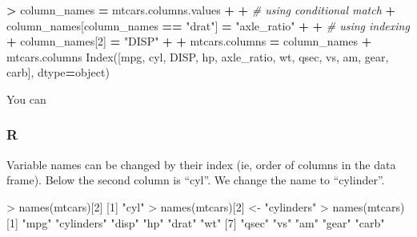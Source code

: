 \documentclass[
]{book}
\newenvironment{Shaded}{\begin{snugshade}}{\end{snugshade}}
\newcommand{\CommentTok}[1]{\textcolor[rgb]{0.56,0.35,0.01}{\textit{#1}}}
\newcommand{\DecValTok}[1]{\textcolor[rgb]{0.00,0.00,0.81}{#1}}
\newcommand{\FunctionTok}[1]{\textcolor[rgb]{0.00,0.00,0.00}{#1}}
\newcommand{\NormalTok}[1]{#1}
\newcommand{\OperatorTok}[1]{\textcolor[rgb]{0.81,0.36,0.00}{\textbf{#1}}}
\newcommand{\OtherTok}[1]{\textcolor[rgb]{0.56,0.35,0.01}{#1}}
\newcommand{\SpecialCharTok}[1]{\textcolor[rgb]{0.00,0.00,0.00}{#1}}
\newcommand{\StringTok}[1]{\textcolor[rgb]{0.31,0.60,0.02}{#1}}
\begin{document}
\begin{Shaded}
\begin{Highlighting}[]
\OperatorTok{\textgreater{}}\NormalTok{ column\_names }\OperatorTok{=}\NormalTok{ mtcars.columns.values}
\OperatorTok{+} 
\OperatorTok{+} \CommentTok{\# using conditional match}
\OperatorTok{+}\NormalTok{ column\_names[column\_names }\OperatorTok{==} \StringTok{"drat"}\NormalTok{] }\OperatorTok{=} \StringTok{"axle\_ratio"}
\OperatorTok{+} 
\OperatorTok{+} \CommentTok{\# using indexing}
\OperatorTok{+}\NormalTok{ column\_names[}\DecValTok{2}\NormalTok{] }\OperatorTok{=} \StringTok{"DISP"}
\OperatorTok{+} 
\OperatorTok{+}\NormalTok{ mtcars.columns }\OperatorTok{=}\NormalTok{ column\_names}
\OperatorTok{+}\NormalTok{ mtcars.columns}
\NormalTok{Index([}\StringTok{\textquotesingle{}mpg\textquotesingle{}}\NormalTok{, }\StringTok{\textquotesingle{}cyl\textquotesingle{}}\NormalTok{, }\StringTok{\textquotesingle{}DISP\textquotesingle{}}\NormalTok{, }\StringTok{\textquotesingle{}hp\textquotesingle{}}\NormalTok{, }\StringTok{\textquotesingle{}axle\_ratio\textquotesingle{}}\NormalTok{, }\StringTok{\textquotesingle{}wt\textquotesingle{}}\NormalTok{, }\StringTok{\textquotesingle{}qsec\textquotesingle{}}\NormalTok{, }\StringTok{\textquotesingle{}vs\textquotesingle{}}\NormalTok{, }\StringTok{\textquotesingle{}am\textquotesingle{}}\NormalTok{,}
       \StringTok{\textquotesingle{}gear\textquotesingle{}}\NormalTok{, }\StringTok{\textquotesingle{}carb\textquotesingle{}}\NormalTok{],}
\NormalTok{      dtype}\OperatorTok{=}\StringTok{\textquotesingle{}object\textquotesingle{}}\NormalTok{)}
\end{Highlighting}
\end{Shaded}

You can

\hypertarget{r-16}{%
\subsubsection*{R}\label{r-16}}

Variable names can be changed by their index (ie, order of columns in the data frame). Below the second column is ``cyl''. We change the name to ``cylinder''.

\begin{Shaded}
\begin{Highlighting}[]
\SpecialCharTok{\textgreater{}} \FunctionTok{names}\NormalTok{(mtcars)[}\DecValTok{2}\NormalTok{]}
\NormalTok{[}\DecValTok{1}\NormalTok{] }\StringTok{"cyl"}
\SpecialCharTok{\textgreater{}} \FunctionTok{names}\NormalTok{(mtcars)[}\DecValTok{2}\NormalTok{] }\OtherTok{\textless{}{-}} \StringTok{"cylinders"}
\SpecialCharTok{\textgreater{}} \FunctionTok{names}\NormalTok{(mtcars)}
\NormalTok{ [}\DecValTok{1}\NormalTok{] }\StringTok{"mpg"}       \StringTok{"cylinders"} \StringTok{"disp"}      \StringTok{"hp"}        \StringTok{"drat"}      \StringTok{"wt"}       
\NormalTok{ [}\DecValTok{7}\NormalTok{] }\StringTok{"qsec"}      \StringTok{"vs"}        \StringTok{"am"}        \StringTok{"gear"}      \StringTok{"carb"}     
\end{Highlighting}
\end{Shaded}
\end{document}
